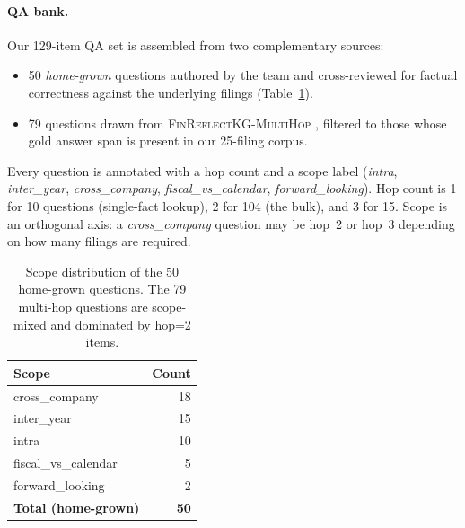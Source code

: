 \documentclass[11pt]{article}
\begin{document}
\paragraph{QA bank.}
Our 129-item QA set is assembled from two complementary sources:
\begin{itemize}
\itemsep 0pt \parskip 0pt
  \item 50 \textit{home-grown} questions authored by the team and
    cross-reviewed for factual correctness against the underlying
    filings (Table~\ref{tab:qa-scope}).
  \item 79 questions drawn from \textsc{FinReflectKG-MultiHop}
    \citep{finreflectkg2025}, filtered to those whose gold answer span
    is present in our 25-filing corpus.
\end{itemize}
Every question is annotated with a hop count and a scope label
(\textit{intra}, \textit{inter\_year}, \textit{cross\_company},
\textit{fiscal\_vs\_calendar}, \textit{forward\_looking}). Hop count is
1 for 10 questions (single-fact lookup), 2 for 104 (the bulk), and 3
for 15. Scope is an orthogonal axis: a \textit{cross\_company} question
may be hop~2 or hop~3 depending on how many filings are required.

\begin{table}[h]
\centering
\small
\begin{tabular}{lr}
\toprule
Scope & Count \\
\midrule
cross\_company       & 18 \\
inter\_year          & 15 \\
intra                & 10 \\
fiscal\_vs\_calendar &  5 \\
forward\_looking     &  2 \\
\midrule
\textbf{Total (home-grown)} & \textbf{50} \\
\bottomrule
\end{tabular}
\caption{Scope distribution of the 50 home-grown questions. The 79
multi-hop questions are scope-mixed and dominated by hop=2 items.}
\label{tab:qa-scope}
\end{table}
\end{document}
